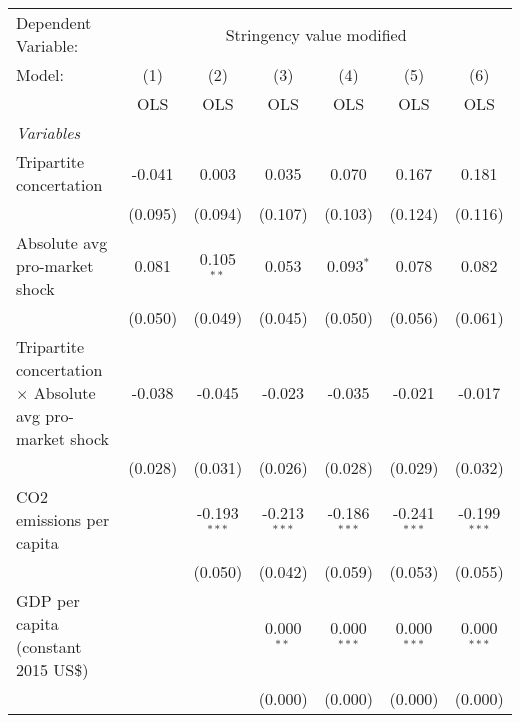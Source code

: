 
\begingroup
\centering
\begin{tabular}{lcccccc}
   \toprule
   Dependent Variable: & \multicolumn{6}{c}{Stringency value modified}\\
   Model:                                                          & (1)     & (2)            & (3)            & (4)            & (5)            & (6)\\  
                                                                   &  OLS    & OLS            & OLS            & OLS            & OLS            & OLS\\  
   \midrule
   \emph{Variables}\\
   Tripartite concertation                                         & -0.041  & 0.003          & 0.035          & 0.070          & 0.167          & 0.181\\   
                                                                   & (0.095) & (0.094)        & (0.107)        & (0.103)        & (0.124)        & (0.116)\\   
   Absolute avg pro-market shock                                   & 0.081   & 0.105$^{**}$   & 0.053          & 0.093$^{*}$    & 0.078          & 0.082\\   
                                                                   & (0.050) & (0.049)        & (0.045)        & (0.050)        & (0.056)        & (0.061)\\   
   Tripartite concertation $\times$ Absolute avg pro-market shock  & -0.038  & -0.045         & -0.023         & -0.035         & -0.021         & -0.017\\   
                                                                   & (0.028) & (0.031)        & (0.026)        & (0.028)        & (0.029)        & (0.032)\\   
   CO2 emissions per capita                                        &         & -0.193$^{***}$ & -0.213$^{***}$ & -0.186$^{***}$ & -0.241$^{***}$ & -0.199$^{***}$\\   
                                                                   &         & (0.050)        & (0.042)        & (0.059)        & (0.053)        & (0.055)\\   
   GDP per capita (constant 2015 US\$)                             &         &                & 0.000$^{**}$   & 0.000$^{***}$  & 0.000$^{***}$  & 0.000$^{***}$\\   
                                                                   &         &                & (0.000)        & (0.000)        & (0.000)        & (0.000)\\   

\end{tabular}
